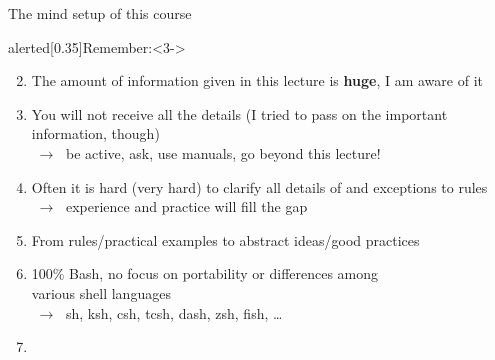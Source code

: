 \begin{frame}{The mind setup of this course}
    \vspace{-3mm}
    \begin{varblock}{alerted}[0.35\textwidth]{Remember:}<3->
    \end{varblock}
    \vspace{1mm}
    \begin{enumerate}
        \setcounter{enumi}{1}
        \item<3-> The amount of information given in this lecture is \textbf{huge}, I am aware of it
        \item<3-> You will not receive all the details (I tried to pass on the important information, though)\\
                  $\;\to\;$ be active, ask, use manuals, go beyond this lecture!
        \item<4-> Often it is hard (very hard) to clarify all details of and exceptions to rules \\
                  $\;\to\;$ experience and practice will fill the gap
        \item<4-> From rules/practical examples to abstract ideas/good practices
        \item<5-> 100\% Bash, no focus on portability or differences among \\ various shell languages \\
                  $\;\to\;$ sh, ksh, csh, tcsh, dash, zsh, fish, \ldots
        \setcounter{enumi}{0}
        \item<2-> \\
    \end{enumerate}
\end{frame}
